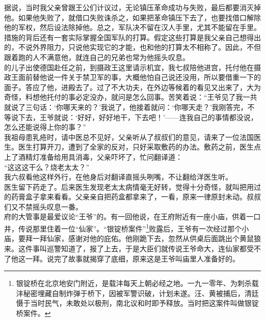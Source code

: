 据说，当时我父亲曾跟王公们计议过，无论镇压革命成功与失败，最后都要消灭掉他。如果他失败了，就借口失败诛杀之，如果把革命镇压下去了，也要找借口解除他的军权，然后设法除掉他。总之，军队决不留在汉人手里，尤其不能留在手里。措施的背后还有一套实际掌握全国军队的打算。假定这些打算是我父亲自己想得出的，不说外界阻力，只说他实现它的才能，也和他的打算太不相称了。因此，不但跟着跑的人不满意他，就连自己的兄弟也常为他摇头叹息。\\

的儿子出使德国赴任之前，到摄政王这里请示机宜，我七叔陪他进宫，托付他在摄政王面前替他说一件关于禁卫军的事，大概他怕自己说还没用，所以要借重一下的面子。答应了他，进殿去了。过了不大功夫，在外边等候着的看见又出来了，大为奇怪，料想他托付的事必定没办，就问是怎么回事。苦笑着说：“王爷见了我一共就说了三句话：‘你哪天来的？’我说了，他接着就问：‘你哪天走？’我刚答完，不等说下去，王爷就说：‘好好，好好地干，下去吧！’——连我自己的事情都没说，怎么还能说得上你的事？”\\

我祖母患乳疮时，请中医总不见好，父亲听从了叔叔们的意见，请来了一位法国医生。医生打算开刀，遭到了全家的反对，只好采取敷药的办法。敷药之前，医生点上了酒精灯准备给用具消毒，父亲吓坏了，忙问翻译道：\\

“这这这干么？烧老太太？”\\

我六叔看他这样外行，在他身后对翻译直摇头咧嘴，不让翻给洋医生听。\\

医生留下药走了。后来医生发现老太太病情毫无好转，觉得十分奇怪，就叫把用过的药膏盒子拿来看看。父亲亲自把药盒都拿来了，一看，原来一律原封未动。叔叔们又不禁摇头叹息一番。\\

府的大管事是最爱议论“王爷”的。有一回他说，在王府附近有一座小庙，供着一口井，传说那里住着一位“仙家”。“银锭桥案件”\footnote{银锭桥在北京地安门附近，是载沣每天上朝必经之地。一九一零年、为刺杀载沣秘密埋藏自制炸弹于桥下，因被军警识破，计划未遂。汪、黄被捕后，清廷慑于当时民气，未敢处以极刑，南北议和时即予释放。当时把这案件叫做银锭桥案件。}败露后，王爷有一次经过那个小庙，要拜一拜仙家，感谢对他的庇佑。他刚跪下去，忽然从供桌后面跳出个黄鼠狼来。这件事叫巡警知道了，报了上去，于是大臣们就传说王爷命大，连仙家都受不了他这一拜。说完了故事就揭穿了底细，原来这是王爷叫庙里人准备好的。\\

